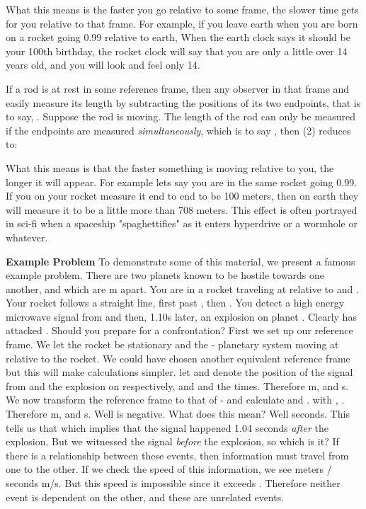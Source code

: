 \documentclass[conference]{IEEEtran}
\begin{document}
What this means is the faster you go relative to some frame, the slower time gets for you relative to that frame. For example, if you leave earth when you are born on a rocket going 0.99 relative to earth, When the earth clock says it should be your 100th birthday, the rocket clock will say that you are only a little over 14 years old, and you will look and feel only 14. 

If a rod is at rest in some reference frame, then any observer in that frame and easily measure its length by subtracting the positions of its two endpoints, that is to say, . Suppose the rod is moving. The length of the rod can only be measured if the endpoints are measured \textit{simultaneously}, which is to say , then (2) reduces to: 

What this means is that the faster something is moving relative to you, the longer it will appear. For example lets say you are in the same rocket going 0.99. If you on your rocket measure it end to end to be 100 meters, then on earth they will measure it to be a little more than 708 meters. This effect is often portrayed in sci-fi when a spaceship "spaghettifies" as it enters hyperdrive or a wormhole or whatever. \cite{spaghetti}

\textbf{Example Problem} To demonstrate some of this material, we present a famous example problem. There are two planets known to be hostile towards one another,  and  which are m apart. You are in a rocket traveling at  relative to  and . Your rocket follows a straight line, first past , then . You detect a high energy microwave signal from  and then, 1.10s later, an explosion on planet . Clearly  has attacked . Should you prepare for a confrontation? First we set up our reference frame. We let the rocket be stationary and the - planetary system moving at  relative to the rocket. We could have chosen another equivalent reference frame but this will make calculations simpler. let  and  denote the position of the signal from  and the explosion on  respectively, and  and  the times. Therefore m, and s. We now transform the reference frame to that of - and calculate  and . with , . Therefore m, and s. Well  is negative. What does this mean? Well  seconds. This tells us that  which implies that the signal happened 1.04 seconds \textit{after} the explosion. But we witnessed the signal \textit{before} the explosion, so which is it? If there is a relationship between these events, then information must travel from one to the other. If we check the speed of this information, we see  meters /  seconds  m/s. But this speed is impossible since it exceeds . Therefore neither event is dependent on the other, and these are unrelated events.
 
\end{document}
